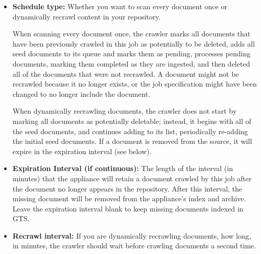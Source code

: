 %
%

\begin{itemize}
\label{scheduling}

\item \textbf{Schedule type:} Whether you want to scan every document
once or dynamically recrawl content in your repository. 

When scanning every document once, the crawler marks all documents that
have been previously crawled in this job as potentially to be deleted,
adds all seed documents to its queue and marks them as pending, processes
pending documents, marking them completed as they are ingested, and then
deleted all of the documents that were not recrawled. A document might
not be recrawled because it no longer exists, or the job specification
might have been changed to no longer include the document.

When dynamically recrawling documents, the crawler does not start by
marking all documents as potentially deletable; instead, it begins with
all of the seed documents, and continues adding to its list, periodically
re-adding the initial seed documents. If a document is removed from the
source, it will expire in the expiration interval (see below).

\item \textbf{Expiration Interval (if continuous):} The length of the
interval (in minutes) that the appliance will retain a document
crawled by this job after the document no longer appears in the
repository. After this interval, the missing document will be removed
from the appliance's index and archive. Leave the expiration interval
blank to keep missing documents indexed in GTS.

\item \textbf{Recrawl interval:} If you are dynamically recrawling
documents, how long, in minutes, the crawler should wait before
crawling documents a second time.


\end{itemize}
